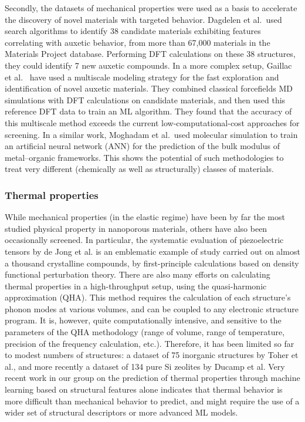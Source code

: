 \documentclass[main.tex]{subfiles}
\begin{document}
Secondly, the datasets of mechanical properties were used as a basis to accelerate the discovery of novel materials with targeted behavior. Dagdelen et al.\ used search algorithms to identify 38 candidate materials exhibiting features correlating with auxetic behavior, from more than 67,000 materials in the Materials Project database.\autocite{Dagdelen_2017} Performing DFT calculations on these 38 structures, they could identify 7 new auxetic compounds. In a more complex setup, Gaillac et al.~\autocite{Gaillac_2020} have used a multiscale modeling strategy for the fast exploration and identification of novel auxetic materials. They combined classical forcefields MD simulations with DFT calculations on candidate materials, and then used this reference DFT data to train an ML algorithm. They found that the accuracy of this multiscale method exceeds the current low-computational-cost approaches for screening. In a similar work, Moghadam et al.\ used molecular simulation to train an artificial neural network (ANN) for the prediction of the bulk modulus of metal--organic frameworks.\autocite{Moghadam_2019} This shows the potential of such methodologies to treat very different (chemically as well as structurally) classes of materials.

\subsubsection{Thermal properties}

While mechanical properties (in the elastic regime) have been by far the most studied physical property in nanoporous materials, others have also been occasionally screened. In particular, the systematic evaluation of piezoelectric tensors by de Jong et al. is an emblematic example of study carried out on almost a thousand crystalline compounds, by first-principle calculations based on density functional perturbation theory.\autocite{deJong2015_piezo} There are also many efforts on calculating thermal properties in a high-throughput setup, using the quasi-harmonic approximation (QHA).\autocite{Togo_2010} This method requires the calculation of each structure's phonon modes at various volumes, and can be coupled to any electronic structure program.\autocite{Togo_2015} It is, however, quite computationally intensive, and sensitive to the parameters of the QHA methodology (range of volume, range of temperature, precision of the frequency calculation, etc.). Therefore, it has been limited so far to modest numbers of structures: a dataset of 75 inorganic structures by Toher et al.,\autocite{Toher_2014} and more recently a dataset of 134 pure Si zeolites by Ducamp et al.\autocite{Ducamp_2021} Very recent work in our group on the prediction of thermal properties through machine learning based on structural features alone indicates that thermal behavior is more difficult than mechanical behavior to predict, and might require the use of a wider set of structural descriptors or more advanced ML models.\autocite{Ducamp_2022}
\end{document}
